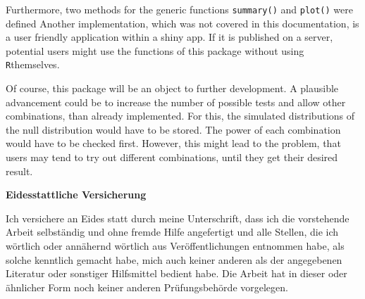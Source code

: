\documentclass[11pt,a4paper]{article}
\begin{document}
Furthermore, two methods for the generic functions \texttt{summary()}
and \texttt{plot()} were defined Another implementation, which was not
covered in this documentation, is a user friendly application within a
shiny app. If it is published on a server, potential users might use the
functions of this package without using \texttt{R}themselves.

Of course, this package will be an object to further development. A
plausible advancement could be to increase the number of possible tests
and allow other combinations, than already implemented. For this, the
simulated distributions of the null distribution would have to be
stored. The power of each combination would have to be checked first.
However, this might lead to the problem, that users may tend to try out
different combinations, until they get their desired result.

\newpage
\renewcommand*{\mkbibnamefamily}[1]{\textbf{#1}}
\renewcommand*{\mkbibnamegiven}[1]{\textbf{#1}}
\renewcommand*{\mkbibnameprefix}[1]{\textbf{#1}}
\renewcommand*{\mkbibnamesuffix}[1]{\textbf{#1}}
\printbibliography[title=References]

\newpage
\textbf{Eidesstattliche Versicherung}

\bigskip

Ich versichere an Eides statt durch meine Unterschrift, dass ich die vorstehende Arbeit selbständig und ohne fremde Hilfe angefertigt und alle Stellen, die ich wörtlich oder annähernd wörtlich aus Veröffentlichungen entnommen habe, als solche kenntlich gemacht habe, mich auch keiner anderen als der angegebenen Literatur oder sonstiger Hilfsmittel bedient habe. Die Arbeit hat in dieser oder ähnlicher Form noch keiner anderen Prüfungsbehörde vorgelegen.

\vspace{1cm}
\rule{0pt}{2\baselineskip} %
\par\noindent{} \hfill\makebox[2.25in]{\hrulefill}%
\par\noindent\makebox[2.25in][l]{} \hfill{}%
\end{document}
